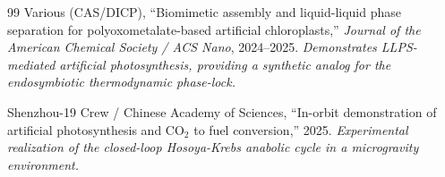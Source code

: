 \begin{thebibliography}{99}
Various (CAS/DICP),
``Biomimetic assembly and liquid-liquid phase separation for polyoxometalate-based artificial chloroplasts,''
\emph{Journal of the American Chemical Society / ACS Nano}, 2024--2025.
\textit{Demonstrates LLPS-mediated artificial photosynthesis, providing a synthetic analog for the endosymbiotic thermodynamic phase-lock.}

Shenzhou-19 Crew / Chinese Academy of Sciences,
``In-orbit demonstration of artificial photosynthesis and $\text{CO}_2$ to fuel conversion,''
2025.
\textit{Experimental realization of the closed-loop Hosoya-Krebs anabolic cycle in a microgravity environment.}

\end{thebibliography}
